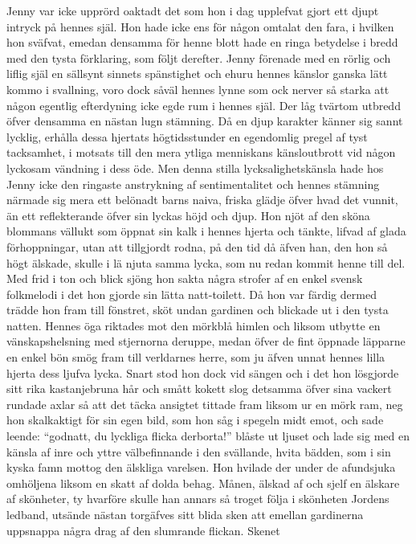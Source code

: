 Jenny var icke upprörd oaktadt det som hon i dag upplefvat gjort ett
djupt intryck på hennes själ. Hon hade icke ens för någon omtalat den
fara, i hvilken hon sväfvat, emedan densamma för henne blott hade en
ringa betydelse i bredd med den tysta förklaring, som följt derefter.
Jenny förenade med en rörlig och liflig själ en sällsynt sinnets
spänstighet och ehuru hennes känslor ganska lätt kommo i svallning, voro
dock såväl hennes lynne som ock nerver så starka att någon egentlig
efterdyning icke egde rum i hennes själ. Der låg tvärtom utbredd öfver
densamma en nästan lugn stämning. Då en djup karakter känner sig sannt
lycklig, erhålla dessa hjertats högtidsstunder en egendomlig pregel af
tyst tacksamhet, i motsats till den mera ytliga menniskans känsloutbrott
vid någon lyckosam vändning i dess öde. Men denna stilla
lycksalighetskänsla hade hos Jenny icke den ringaste anstrykning af
sentimentalitet och hennes stämning närmade sig mera ett belönadt barns
naiva, friska glädje öfver hvad det vunnit, än ett reflekterande öfver
sin lyckas höjd och djup. Hon njöt af den sköna blommans vällukt som
öppnat sin kalk i hennes hjerta och tänkte, lifvad af glada
förhoppningar, utan att tillgjordt rodna, på den tid då äfven han, den
hon så högt älskade, skulle i lä njuta samma lycka, som nu redan kommit
henne till del. Med frid i ton och blick sjöng hon sakta några strofer
af en enkel svensk folkmelodi i det hon gjorde sin lätta natt-toilett.
Då hon var färdig dermed trädde hon fram till fönstret, sköt undan
gardinen och blickade ut i den tysta natten. Hennes öga riktades mot den
mörkblå himlen och liksom utbytte en vänskapshelsning med stjernorna
deruppe, medan öfver de fint öppnade läpparne en enkel bön smög fram
till verldarnes herre, som ju äfven unnat hennes lilla hjerta dess
ljufva lycka. Snart stod hon dock vid sängen och i det hon lösgjorde
sitt rika kastanjebruna hår och smått kokett slog detsamma öfver sina
vackert rundade axlar så att det täcka ansigtet tittade fram liksom ur
en mörk ram, neg hon skalkaktigt för sin egen bild, som hon såg i
spegeln midt emot, och sade leende: ``godnatt, du lyckliga flicka
derborta!'' blåste ut ljuset och lade sig med en känsla af inre och
yttre välbefinnande i den svällande, hvita bädden, som i sin kyska famn
mottog den älskliga varelsen. Hon hvilade der under de afundsjuka
omhöljena liksom en skatt af dolda behag. Månen, älskad af och sjelf en
älskare af skönheter, ty hvarföre skulle han annars så troget följa i
skönheten Jordens ledband, utsände nästan torgäfves sitt blida sken att
emellan gardinerna uppsnappa några drag af den slumrande flickan. Skenet
